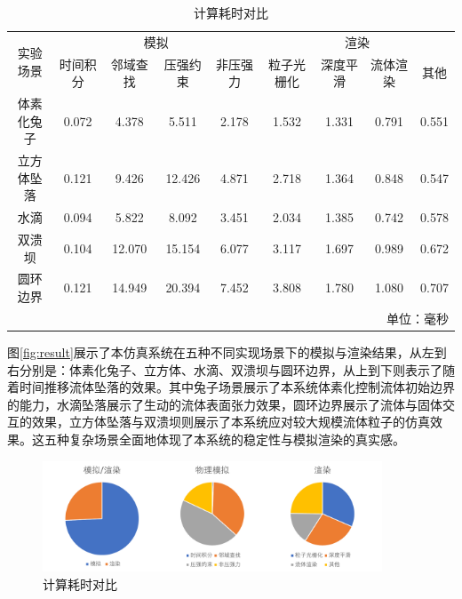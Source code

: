     \begin{table}
    	\centering
    	\caption{计算耗时对比}
    	\begin{tabular}{ccccccccc}
    	\toprule
    	\multirow{2}{*}{实验场景} &
    	\multicolumn{4}{c}{模拟} &
    	\multicolumn{4}{c}{渲染} \\
    	\cmidrule(lr){2-5} \cmidrule(lr){6-9}
    	& 时间积分 & 邻域查找 & 压强约束 & 非压强力 & 粒子光栅化 & 深度平滑 & 流体渲染 & 其他 \\
    	\midrule
    	体素化兔子
    	& 0.072	& 4.378	& 5.511	& 2.178	& 1.532	& 1.331	& 0.791	& 0.551	\\
    	立方体坠落
    	& 0.121	& 9.426	& 12.426& 4.871	& 2.718 & 1.364 & 0.848	& 0.547	\\
    	水滴			
    	& 0.094 & 5.822 & 8.092	& 3.451	& 2.034	& 1.385	& 0.742	& 0.578	\\
    	双溃坝		
    	& 0.104	& 12.070& 15.154& 6.077	& 3.117	& 1.697	& 0.989	& 0.672	\\
    	圆环边界		
    	& 0.121	& 14.949& 20.394& 7.452	& 3.808	& 1.780	& 1.080	& 0.707 \\
    	\bottomrule
    	\multicolumn{9}{r}{单位：毫秒}\\
    	\end{tabular}
    	\label{tab:comp}
    \end{table}
    
    图\ref{fig:result}展示了本仿真系统在五种不同实现场景下的模拟与渲染结果，从左到右分别是：体素化兔子、立方体、水滴、双溃坝与圆环边界，从上到下则表示了随着时间推移流体坠落的效果。其中兔子场景展示了本系统体素化控制流体初始边界的能力，水滴坠落展示了生动的流体表面张力效果，圆环边界展示了流体与固体交互的效果，立方体坠落与双溃坝则展示了本系统应对较大规模流体粒子的仿真效果。这五种复杂场景全面地体现了本系统的稳定性与模拟渲染的真实感。

    \begin{figure}
    	\centering
    	\includegraphics[width=0.9\textwidth]{figures/webgpu/comp.pdf}
    	\caption{计算耗时对比}
    	\label{fig:comp}
    \end{figure}
    
